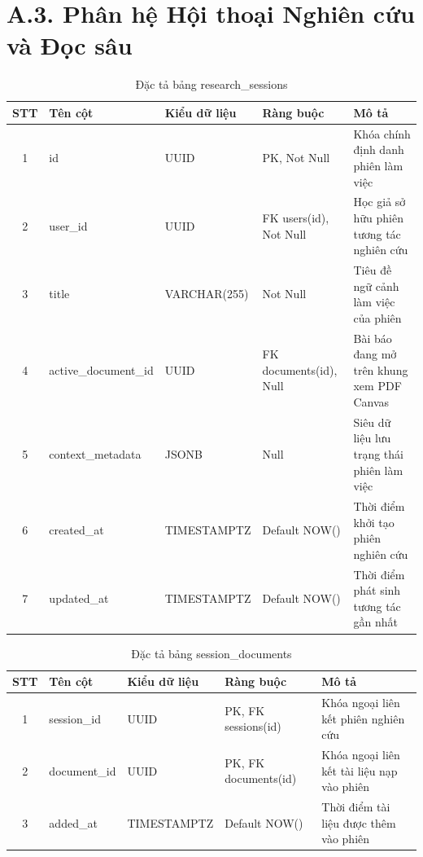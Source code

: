 \section*{A.3. Phân hệ Hội thoại Nghiên cứu và Đọc sâu}

\begin{table}[H]
\centering
\singlespacing
\fontsize{9pt}{11.5pt}\selectfont
\caption{Đặc tả bảng research\_sessions}
\label{tab:app_sessions}
\renewcommand{\arraystretch}{0.65}
\begin{tabularx}{\textwidth}{|c|>{\raggedright\arraybackslash}p{3.2cm}|>{\raggedright\arraybackslash}p{2.6cm}|>{\raggedright\arraybackslash}p{3.0cm}|>{\raggedright\arraybackslash}X|}
\hline
\textbf{STT} & \centering\textbf{Tên cột} & \centering\textbf{Kiểu dữ liệu} & \centering\textbf{Ràng buộc} & \centering\textbf{Mô tả} \tabularnewline \hline
1 & id & UUID & PK, Not Null & Khóa chính định danh phiên làm việc \tabularnewline \hline
2 & user\_id & UUID & FK users(id), Not Null & Học giả sở hữu phiên tương tác nghiên cứu \tabularnewline \hline
3 & title & VARCHAR(255) & Not Null & Tiêu đề ngữ cảnh làm việc của phiên \tabularnewline \hline
4 & active\_document\_id & UUID & FK documents(id), Null & Bài báo đang mở trên khung xem PDF Canvas \tabularnewline \hline
5 & context\_metadata & JSONB & Null & Siêu dữ liệu lưu trạng thái phiên làm việc \tabularnewline \hline
6 & created\_at & TIMESTAMPTZ & Default NOW() & Thời điểm khởi tạo phiên nghiên cứu \tabularnewline \hline
7 & updated\_at & TIMESTAMPTZ & Default NOW() & Thời điểm phát sinh tương tác gần nhất \tabularnewline \hline
\end{tabularx}
\end{table}

\begin{table}[H]
\centering
\singlespacing
\fontsize{9pt}{11.5pt}\selectfont
\caption{Đặc tả bảng session\_documents}
\label{tab:app_session_documents}
\renewcommand{\arraystretch}{0.65}
\begin{tabularx}{\textwidth}{|c|>{\raggedright\arraybackslash}p{3.2cm}|>{\raggedright\arraybackslash}p{2.6cm}|>{\raggedright\arraybackslash}p{3.0cm}|>{\raggedright\arraybackslash}X|}
\hline
\textbf{STT} & \centering\textbf{Tên cột} & \centering\textbf{Kiểu dữ liệu} & \centering\textbf{Ràng buộc} & \centering\textbf{Mô tả} \tabularnewline \hline
1 & session\_id & UUID & PK, FK sessions(id) & Khóa ngoại liên kết phiên nghiên cứu \tabularnewline \hline
2 & document\_id & UUID & PK, FK documents(id) & Khóa ngoại liên kết tài liệu nạp vào phiên \tabularnewline \hline
3 & added\_at & TIMESTAMPTZ & Default NOW() & Thời điểm tài liệu được thêm vào phiên \tabularnewline \hline
\end{tabularx}
\end{table}

